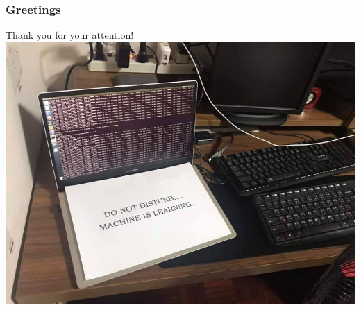 \documentclass{beamer}
\begin{document}
\begin{frame}
	\frametitle{Greetings}
	\center Thank you for your attention!
	\center \includegraphics[scale = 0.22]{dndmil.jpeg}
\end{frame}

\end{document}
